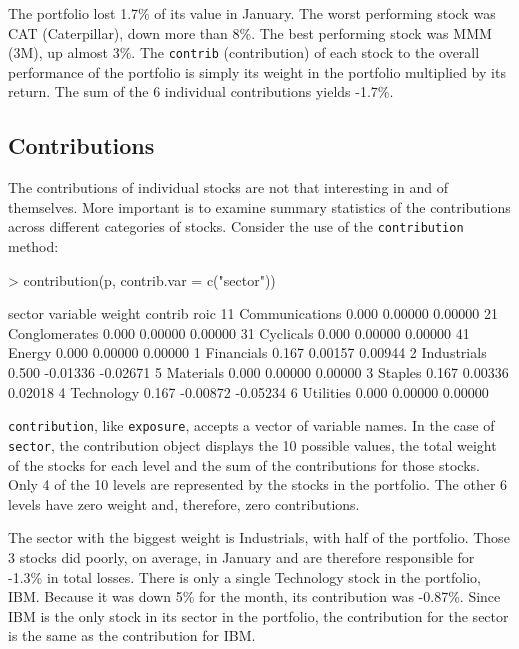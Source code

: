 \documentclass[a4paper]{report}
\begin{document}
\begin{article}
The portfolio lost 1.7\% of its value in January. The worst performing
stock was CAT (Caterpillar), down more than 8\%. The best performing
stock was MMM (3M), up almost 3\%. The \texttt{contrib} (contribution)
of each stock to the overall performance of the portfolio is simply
its weight in the portfolio multiplied by its return. The sum of the 6
individual contributions yields -1.7\%.


\subsection*{Contributions}

The contributions of individual stocks are not that interesting in and
of themselves. More important is to examine summary statistics of the
contributions across different categories of stocks. Consider the use
of the \texttt{contribution} method:

\begin{Schunk}
\begin{Sinput}
> contribution(p, contrib.var = c("sector"))
\end{Sinput}
\begin{Soutput}
sector 
         variable weight  contrib     roic
11 Communications  0.000  0.00000  0.00000
21  Conglomerates  0.000  0.00000  0.00000
31      Cyclicals  0.000  0.00000  0.00000
41         Energy  0.000  0.00000  0.00000
1      Financials  0.167  0.00157  0.00944
2     Industrials  0.500 -0.01336 -0.02671
5       Materials  0.000  0.00000  0.00000
3         Staples  0.167  0.00336  0.02018
4      Technology  0.167 -0.00872 -0.05234
6       Utilities  0.000  0.00000  0.00000
\end{Soutput}
\end{Schunk}

\texttt{contribution}, like \texttt{exposure}, accepts a vector of
variable names.  In the case of \texttt{sector}, the contribution
object displays the 10 possible values, the total weight of the stocks
for each level and the sum of the contributions for those stocks. Only
4 of the 10 levels are represented by the stocks in the portfolio. The
other 6 levels have zero weight and, therefore, zero contributions.

The sector with the biggest weight is Industrials, with half of the
portfolio. Those 3 stocks did poorly, on average, in January and are
therefore responsible for -1.3\% in total losses. There is only a
single Technology stock in the portfolio, IBM. Because it was down 5\%
for the month, its contribution was -0.87\%. Since IBM is the only
stock in its sector in the portfolio, the contribution for the sector
is the same as the contribution for IBM.


\end{article}
\end{document}

